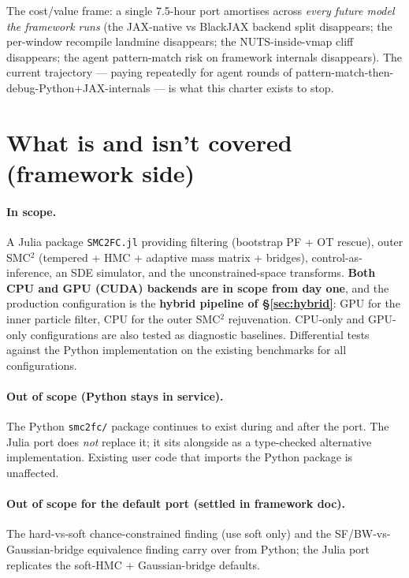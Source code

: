 \documentclass[11pt,a4paper]{article}
\begin{document}
The cost/value frame: a single 7.5-hour port amortises across
\emph{every future model the framework runs} (the JAX-native vs
BlackJAX backend split disappears; the per-window recompile
landmine disappears; the NUTS-inside-vmap cliff disappears; the
agent pattern-match risk on framework internals disappears). The
current trajectory --- paying repeatedly for agent rounds of
pattern-match-then-debug-Python+JAX-internals --- is what this
charter exists to stop.

\section{What is and isn't covered (framework side)}
\label{sec:in-out-julia}

\paragraph{In scope.} A Julia package \texttt{SMC2FC.jl}
providing filtering (bootstrap PF + OT rescue), outer SMC$^2$
(tempered + HMC + adaptive mass matrix + bridges),
control-as-inference, an SDE simulator, and the
unconstrained-space transforms. \textbf{Both CPU and GPU (CUDA)
backends are in scope from day one}, and the production
configuration is the \textbf{hybrid pipeline of
§\ref{sec:hybrid}}: GPU for the inner particle filter, CPU for
the outer SMC$^2$ rejuvenation. CPU-only and GPU-only
configurations are also tested as diagnostic baselines.
Differential tests against the Python implementation on the
existing benchmarks for all configurations.

\paragraph{Out of scope (Python stays in service).} The Python
\texttt{smc2fc/} package continues to exist during and after the
port. The Julia port does \emph{not} replace it; it sits
alongside as a type-checked alternative implementation. Existing
user code that imports the Python package is unaffected.

\paragraph{Out of scope for the default port (settled in framework
doc).} The hard-vs-soft chance-constrained finding (use soft
only) and the SF/BW-vs-Gaussian-bridge equivalence finding carry
over from Python; the Julia port replicates the soft-HMC +
Gaussian-bridge defaults.
\end{document}
